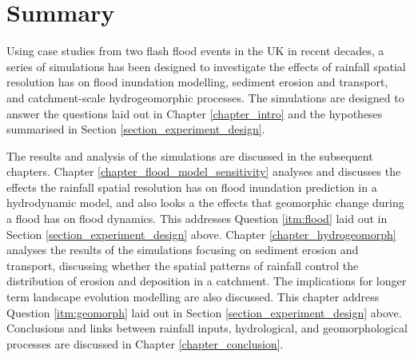 %

\section{Summary}

Using case studies from two flash flood events in the UK in recent decades, a series of simulations has been designed to investigate the effects of rainfall spatial resolution has on flood inundation modelling, sediment erosion and transport, and catchment-scale hydrogeomorphic processes. The simulations are designed to answer the questions laid out in Chapter \ref{chapter_intro} and the hypotheses summarised in Section \ref{section_experiment_design}. 

The results and analysis of the simulations are discussed in the subsequent chapters. Chapter \ref{chapter_flood_model_sensitivity} analyses and discusses the effects the rainfall spatial resolution has on flood inundation prediction in a hydrodynamic model, and also looks a the effects that geomorphic change during a flood has on flood dynamics. This addresses Question \ref{itm:flood} laid out in Section \ref{section_experiment_design} above. Chapter \ref{chapter_hydrogeomorph} analyses the results of the simulations focusing on sediment erosion and transport, discussing whether the spatial patterns of rainfall control the distribution of erosion and deposition in a catchment. The implications for longer term landscape evolution modelling are also discussed. This chapter address Question \ref{itm:geomorph} laid out in Section \ref{section_experiment_design} above. Conclusions and links between rainfall inputs, hydrological, and geomorphological processes are discussed in Chapter \ref{chapter_conclusion}.
